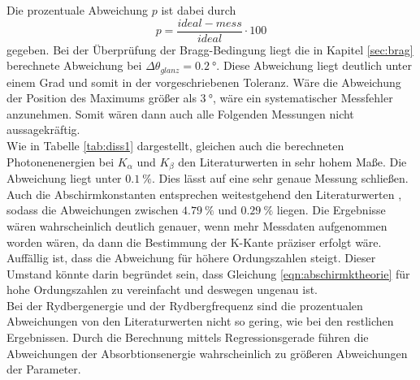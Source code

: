 Die prozentuale Abweichung $p$ ist dabei durch 
\begin{equation*}
  p=\frac{ideal-mess}{ideal}\cdot \num{100}
\end{equation*}
gegeben.
Bei der Überprüfung der Bragg-Bedingung liegt die in Kapitel \ref{sec:brag} berechnete Abweichung bei $\Delta\theta_{glanz}=\SI{0.2}{\degree}$.
Diese Abweichung liegt deutlich unter einem Grad und somit in der vorgeschriebenen Toleranz. Wäre die Abweichung der Position des Maximums 
größer als $\SI{3}{\degree}$, wäre ein systematischer Messfehler anzunehmen. Somit wären dann auch alle Folgenden Messungen nicht aussagekräftig.
\\\noindent
Wie in Tabelle \ref{tab:diss1} dargestellt, gleichen auch die berechneten Photonenenergien bei $K_\alpha$ und $K_\beta$
den Literaturwerten in sehr hohem Maße. Die Abweichung liegt unter $\SI{0.1}{\percent}$. Dies lässt auf eine sehr genaue Messung schließen.
\\\noindent
Auch die Abschirmkonstanten entsprechen weitestgehend den Literaturwerten \cite{AP05}, sodass die Abweichungen zwischen $\SI{4.79}{\percent}$
und $\SI{0.29}{\percent}$ liegen. Die Ergebnisse wären wahrscheinlich deutlich genauer, wenn mehr Messdaten aufgenommen worden wären, da
dann die Bestimmung der K-Kante präziser erfolgt wäre. Auffällig ist, dass die Abweichung für höhere Ordungszahlen steigt. Dieser Umstand 
könnte darin begründet sein, dass Gleichung \ref{eqn:abschirmktheorie} für hohe Ordungszahlen zu vereinfacht und deswegen ungenau ist.
\\\noindent
Bei der Rydbergenergie und der Rydbergfrequenz sind die prozentualen Abweichungen von den Literaturwerten \cite{AP06} nicht so gering, wie bei
den restlichen Ergebnissen. Durch die Berechnung mittels Regressionsgerade führen die Abweichungen der Absorbtionsenergie wahrscheinlich
zu größeren Abweichungen der Parameter.


